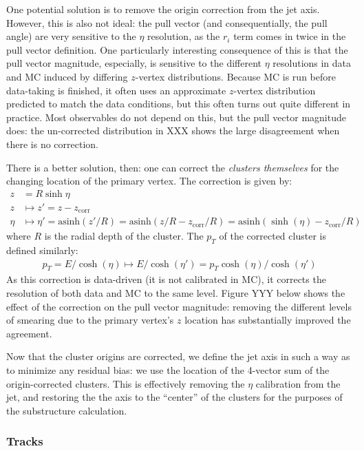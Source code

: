 One potential solution is to remove the origin correction from the jet axis. However, this is also not ideal: the pull vector (and consequentially, the pull angle) are very sensitive to the $\eta$ resolution, as the $r_i$ term comes in twice in the pull vector definition. One particularly interesting consequence of this is that the pull vector magnitude, especially, is sensitive to the different $\eta$ resolutions in data and MC induced by differing $z$-vertex distributions. Because MC is run before data-taking is finished, it often uses an approximate $z$-vertex distribution predicted to match the data conditions, but this often turns out quite different in practice. Most observables do not depend on this, but the pull vector magnitude does: the un-corrected distribution in XXX shows the large disagreement when there is no correction.

There is a better solution, then: one can correct the \textit{clusters themselves} for the changing location of the primary vertex. The correction is given by: 
%
\begin{align}
z &= R\sinh\eta\nonumber\\
z &\mapsto z' = z - z_\text{corr}\nonumber\\
\eta &\mapsto \eta' = \text{asinh} (z'/R) = \text{asinh}(z/R - z_\text{corr}/R) = \text{asinh}(\sinh(\eta) - z_\text{corr}/R)
\end{align}
%
where $R$ is the radial depth of the cluster. The $p_T$ of the corrected cluster is defined similarly:
%
\begin{align}
p_T=E/\cosh(\eta)\mapsto E/\cosh(\eta')=p_T\cosh(\eta)/\cosh(\eta')
\end{align}
%
As this correction is data-driven (it is not calibrated in MC), it corrects the resolution of both data and MC to the same level. Figure YYY below shows the effect of the correction on the pull vector magnitude: removing the different levels of smearing due to the primary vertex's $z$ location has substantially improved the agreement.

Now that the cluster origins are corrected, we define the jet axis in such a way as to minimize any residual bias: we use the location of the 4-vector sum of the origin-corrected clusters. This is effectively removing the $\eta$ calibration from the jet, and restoring the the axis to the ``center'' of the clusters for the purposes of the substructure calculation.


\subsubsection{Tracks}

